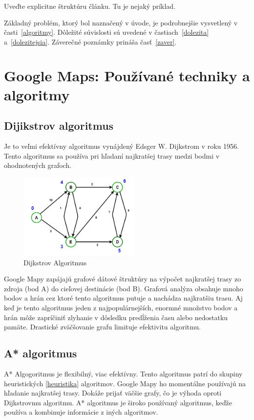 \documentclass[10pt,twoside,slovak,a4paper]{article}
\begin{document}
Uveďte explicitne štruktúru článku. Tu je nejaký príklad.

Základný problém, ktorý bol naznačený v úvode, je podrobnejšie vysvetlený v časti~\ref{algoritmy}.
Dôležité súvislosti sú uvedené v častiach~\ref{dolezita} a~\ref{dolezitejsia}.
Záverečné poznámky prináša časť~\ref{zaver}.

\section{Google Maps: Používané techniky a algoritmy}
\subsection{Dijikstrov algoritmus}
Je to veľmi efektívny algoritmus vynájdený Edsger W. Dijkstrom v roku 1956. Tento algoritmus sa používa pri hľadaní najkratšej trasy medzi bodmi v ohodnotených grafoch.
\begin{figure} 
 \centering
 \includegraphics[width=6cm]{dijkstra}
\caption{Dijkstrov Algoritmus}

\end{figure}

Google Mapy zapájajú grafové dátové štruktúry na výpočet najkratšej trasy zo zdroja (bod A) do cieľovej destinácie (bod B). Grafová analýza obsahuje mnoho bodov a hrán cez ktoré tento algoritmus putuje a nachádza najkratšiu trasu. Aj keď je tento algoritmus jeden z najpopulárnejších, enormné množstvo bodov a hrán môže zapríčiniť zlyhanie v dôsledku predĺženia času alebo nedostatku pamäte. Drastické zväčšovanie grafu limituje efektivitu algoritmu.

\subsection{A* algoritmus}
A* Algogoritmus je flexibilný, viac efektívny. Tento algoritmus patrí do skupiny heuristických \ref{heuristika} algoritmov.
Google Mapy ho momentálne používajú na hľadanie najkratšej trasy. Dokáže prijať väčšie grafy, čo je výhoda oproti Dijkstrovmu algoritmu. A* algoritmus je široko používaný algoritmus, keďže používa a kombinuje informácie z iných algoritmov.
\end{document}
